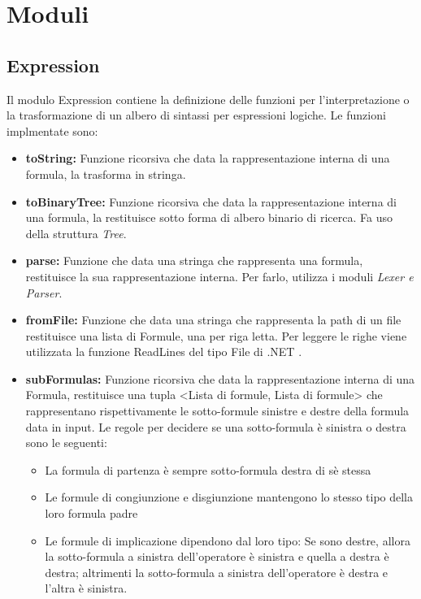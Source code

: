 \documentclass[\main/tesi.tex]{subfiles}
\begin{document}
\section{Moduli}

\subsection{Expression}
Il modulo Expression contiene la definizione delle funzioni per l'interpretazione o la trasformazione di un albero di sintassi per espressioni logiche. Le funzioni implmentate sono:
\begin{itemize}
    \item \textbf{toString:} Funzione ricorsiva che data la rappresentazione interna di una formula, la trasforma in stringa.
    \item \textbf{toBinaryTree:} Funzione ricorsiva che data la rappresentazione interna di una formula, la restituisce sotto forma di albero binario di ricerca. Fa uso della struttura \textit{Tree}.
    \item \textbf{parse:} Funzione che data una stringa che rappresenta una formula, restituisce la sua rappresentazione interna. Per farlo, utilizza i moduli \textit{Lexer e Parser}.
    \item \textbf{fromFile:} Funzione che data una stringa che rappresenta la path di un file restituisce una lista di Formule, una per riga letta. Per leggere le righe viene utilizzata la funzione ReadLines del tipo File di .NET \cite{dotnet}.
    \item \textbf{subFormulas:} Funzione ricorsiva che data la rappresentazione interna di una Formula, restituisce una tupla <Lista di formule, Lista di formule> che rappresentano rispettivamente le sotto-formule sinistre e destre della formula data in input. Le regole per decidere se una sotto-formula è sinistra o destra sono le seguenti:
          \begin{itemize}
              \item La formula di partenza è sempre sotto-formula destra di sè stessa
              \item Le formule di congiunzione e disgiunzione mantengono lo stesso tipo della loro formula padre
              \item Le formule di implicazione dipendono dal loro tipo: Se sono destre, allora la sotto-formula a sinistra dell'operatore è sinistra e quella a destra è destra; altrimenti la sotto-formula a sinistra dell'operatore è destra e l'altra è sinistra.
          \end{itemize}

\end{itemize}
\end{document}
